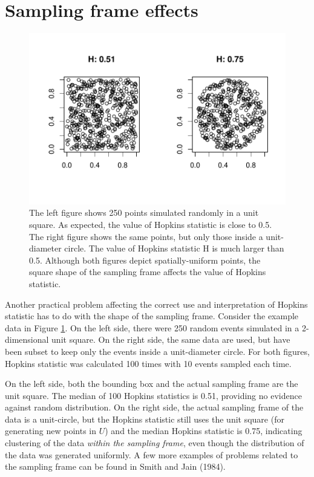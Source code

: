 \hypertarget{sampling-frame-effects}{%
\section{Sampling frame effects}\label{sampling-frame-effects}}

\begin{figure}

{\centering \includegraphics[width=0.9\linewidth]{RJ-2022-055_files/figure-latex/frame-1} 

}

\caption{The left figure shows 250 points simulated randomly in a unit square. As expected, the value of Hopkins statistic is close to 0.5. The right figure shows the same points, but only those inside a unit-diameter circle. The value of Hopkins statistic H is much larger than 0.5. Although both figures depict spatially-uniform points, the square shape of the sampling frame affects the value of Hopkins statistic.}\label{fig:frame}
\end{figure}

Another practical problem affecting the correct use and interpretation of Hopkins statistic has to do with the shape of the sampling frame. Consider the example data in Figure \ref{fig:frame}. On the left side, there were 250 random events simulated in a 2-dimensional unit square. On the right side, the same data are used, but have been subset to keep only the events inside a unit-diameter circle. For both figures, Hopkins statistic was calculated 100 times with 10 events sampled each time.

On the left side, both the bounding box and the actual sampling frame are the unit square. The median of 100 Hopkins statistics is 0.51, providing no evidence against random distribution. On the right side, the actual sampling frame of the data is a unit-circle, but the Hopkins statistic still uses the unit square (for generating new points in \(U\)) and the median Hopkins statistic is 0.75, indicating clustering of the data \emph{within the sampling frame}, even though the distribution of the data was generated uniformly. A few more examples of problems related to the sampling frame can be found in Smith and Jain (1984).

